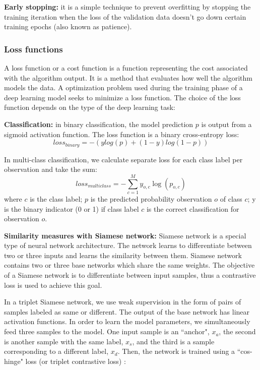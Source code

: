 \noindent\textbf{Early stopping:} it is a simple technique to prevent overfitting by stopping the training iteration when the loss of the validation data doesn't go down certain training epochs (also known as patience). 

\subsubsection{Loss functions}

A loss function or a cost function is a function representing the cost associated with the algorithm output. It is a method that evaluates how well the algorithm models the data. A optimization problem used during the training phase of a deep learning model seeks to minimize a loss function. The choice of the loss function depends on the type of the deep learning task:

\noindent\textbf{Classification:} in binary classification, the model prediction $p$ is output from a sigmoid activation function. The loss function is a binary cross-entropy loss:
\begin{equation}
loss_{binary} = −(ylog(p)+(1−y)log(1−p))
\end{equation}

In multi-class classification, we calculate separate loss for each class label per observation and take the sum:
\begin{equation}
loss_{multiclass} = −\sum_{c=1}^{M} y_{o,c}\log(p_{o,c})
\end{equation}
where $c$ is the class label; $p$ is the predicted probability observation $o$ of class $c$; y is the binary indicator (0 or 1) if class label $c$ is the correct classification for observation $o$.

\noindent\textbf{Similarity measures with Siamese network:} Siamese network \cite{Gupta2017} is a special type of neural network architecture. The network learns to differentiate between two or three inputs and learns the similarity between them. Siamese network contains two or three base networks which share the same weights. The objective of a Siamese network is to differentiate between input samples, thus a contrastive loss is used to achieve this goal.

In a triplet Siamese network, we use weak supervision in the form of pairs of samples labeled as same or different. The output of the base network has linear activation functions. In order to learn the model parameters, we simultaneously feed three samples to the model. One input sample is an ``anchor", $x_a$, the second is another sample with the same label, $x_s$, and the third is a sample corresponding to a different label, $x_d$. Then, the network is trained using a ``cos-hinge" loss (or triplet contrastive loss) \cite{Settle2016a}: 

